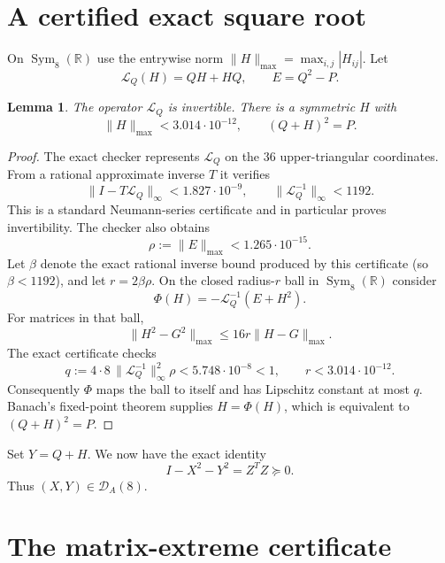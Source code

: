 \documentclass[11pt]{article}
\newtheorem{lemma}{Lemma}
\newcommand{\Sym}{\operatorname{Sym}}
\newcommand{\D}{\mathcal D}
\newcommand{\R}{\mathbb R}
\newcommand{\normmax}[1]{\lVert #1\rVert_{\max}}
\begin{document}
\section{A certified exact square root}

On $\Sym_8(\R)$ use the entrywise norm
$\normmax{H}=\max_{i,j}|H_{ij}|$.  Let
\[
 \mathcal L_Q(H)=QH+HQ,\qquad E=Q^2-P.
\]

\begin{lemma}\label{lem:root}
The operator $\mathcal L_Q$ is invertible.  There is a symmetric $H$ with
\[
 \normmax{H}<3.014\cdot10^{-12},\qquad (Q+H)^2=P.
\]
\end{lemma}

\begin{proof}
The exact checker represents $\mathcal L_Q$ on the 36 upper-triangular
coordinates.  From a rational approximate inverse $T$ it verifies
\[
 \lVert I-T\mathcal L_Q\rVert_\infty<1.827\cdot10^{-9},
 \qquad \lVert\mathcal L_Q^{-1}\rVert_\infty<1192.
\]
This is a standard Neumann-series certificate and in particular proves
invertibility.  The checker also obtains
\[
 \rho:=\normmax{E}<1.265\cdot10^{-15}.
\]
Let $\beta$ denote the exact rational inverse bound produced by this
certificate (so $\beta<1192$), and let $r=2\beta\rho$.  On the closed
radius-$r$ ball in $\Sym_8(\R)$ consider
\[
 \Phi(H)=-\mathcal L_Q^{-1}(E+H^2).
\]
For matrices in that ball,
\[
 \normmax{H^2-G^2}\le 16r\normmax{H-G}.
\]
The exact certificate checks
\[
 q:=4\cdot8\,\lVert\mathcal L_Q^{-1}\rVert_\infty^2\rho
 <5.748\cdot10^{-8}<1,
 \qquad r<3.014\cdot10^{-12}.
\]
Consequently $\Phi$ maps the ball to itself and has Lipschitz constant at
most $q$.  Banach's fixed-point theorem supplies $H=\Phi(H)$, which is
equivalent to $(Q+H)^2=P$.
\end{proof}

Set $Y=Q+H$.  We now have the exact identity
\begin{equation}\label{eq:defect}
 I-X^2-Y^2=Z^TZ\succeq0.
\end{equation}
Thus $(X,Y)\in\D_A(8)$.

\section{The matrix-extreme certificate}
\end{document}
